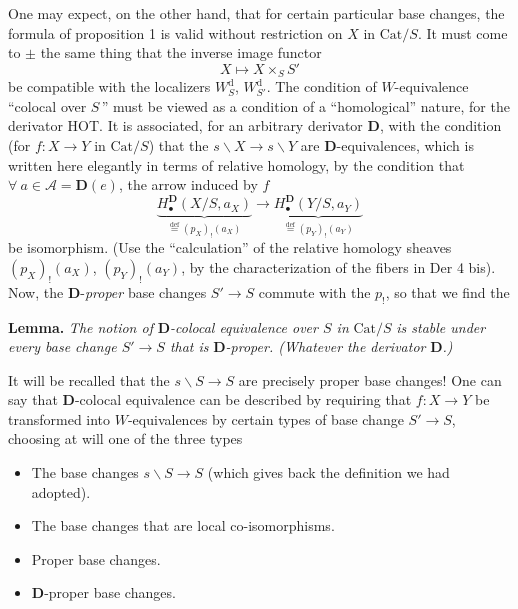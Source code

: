 \documentclass[11pt]{article}
\newcommand{\printedpage}[1]{\marginpar{\footnotesize p.~#1}}
\newcommand{\msp}[1]{\marginpar{\footnotesize [#1]}}
\newcommand{\Cat}{\mathrm{Cat}}
\begin{document}
One may expect, on the other hand, that for certain particular base changes, the formula of proposition 1 is valid without restriction on $X$ in $\Cat/S$. It must come to $\pm$ the same thing that the inverse image functor
\[
X \longmapsto X \times_S S'
\]
be compatible with the localizers $W_S^{\mathrm{d}}$, $W_{S'}^{\mathrm{d}}$. The condition of $W$-equivalence ``colocal over $S$\,'' must be viewed as a condition of a ``homological'' nature, for the derivator HOT. It is associated, for an arbitrary derivator $\mathbf{D}$, with the condition (for $f : X \longrightarrow Y$ in $\Cat/S$) that the $s\backslash X \longrightarrow s\backslash Y$ are $\mathbf{D}$-equivalences,
\printedpage{75}
\msp{page 121}
which is written here elegantly in terms of relative homology, by the condition that $\forall\ a \in \mathcal{A} = \mathbf{D}(e)$, the arrow induced by $f$ %
\[
\underbrace{H_\bullet^{\mathbf{D}}(X/S, a_X)}_{\overset{\text{def}}{=}(p_X)_!(a_X)} \longrightarrow \underbrace{H_\bullet^{\mathbf{D}}(Y/S, a_Y)}_{\overset{\text{def}}{=}(p_Y)_!(a_Y)}
\]
be isomorphism. (Use the ``calculation'' of the relative homology sheaves $(p_X)_!(a_X)$, $(p_Y)_!(a_Y)$, by the characterization of the fibers in Der 4 bis). Now, the $\mathbf{D}$-\textit{proper} base changes $S' \longrightarrow S$ commute with the $p_!$, so that we find the

\textbf{Lemma.} \textit{The notion of} $\mathbf{D}$\textit{-colocal equivalence over $S$ in} $\Cat/S$ \textit{is stable under every base change $S' \longrightarrow S$ that is} $\mathbf{D}$\textit{-proper. (Whatever the derivator} $\mathbf{D}$\textit{.)}

It will be recalled that the $s\backslash S \longrightarrow S$ are precisely proper base changes! One %
can say that $\mathbf{D}$-colocal equivalence can be described by requiring that $f : X \longrightarrow Y$ be transformed into $W$-equivalences by certain types of base change $S' \longrightarrow S$, choosing at will one of the three types

\begin{itemize}
\item[a)] The base changes $s\backslash S \longrightarrow S$ (which gives back the definition we had adopted).
\item[b)] The base changes that are local co-isomorphisms.
\item[c)] Proper base changes.
\item[d)] $\mathbf{D}$-proper base changes.
\end{itemize}
\end{document}
